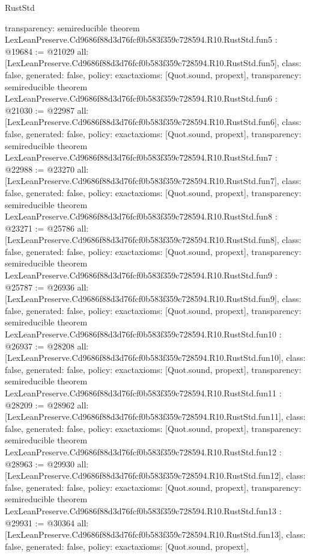 \begin{lexlean}{RustStd}
\begin{coremodule}
{  transparency: semireducible
}
theorem LexLeanPreserve.Cd9686f88d3d76fcf0b583f359c728594.R10.RustStd.fun5 : @19684 := @21029 {
  all: [LexLeanPreserve.Cd9686f88d3d76fcf0b583f359c728594.R10.RustStd.fun5],
  class: false,
  generated: false,
  policy: exact{axioms: [Quot.sound, propext]},
  transparency: semireducible
}
theorem LexLeanPreserve.Cd9686f88d3d76fcf0b583f359c728594.R10.RustStd.fun6 : @21030 := @22987 {
  all: [LexLeanPreserve.Cd9686f88d3d76fcf0b583f359c728594.R10.RustStd.fun6],
  class: false,
  generated: false,
  policy: exact{axioms: [Quot.sound, propext]},
  transparency: semireducible
}
theorem LexLeanPreserve.Cd9686f88d3d76fcf0b583f359c728594.R10.RustStd.fun7 : @22988 := @23270 {
  all: [LexLeanPreserve.Cd9686f88d3d76fcf0b583f359c728594.R10.RustStd.fun7],
  class: false,
  generated: false,
  policy: exact{axioms: [Quot.sound, propext]},
  transparency: semireducible
}
theorem LexLeanPreserve.Cd9686f88d3d76fcf0b583f359c728594.R10.RustStd.fun8 : @23271 := @25786 {
  all: [LexLeanPreserve.Cd9686f88d3d76fcf0b583f359c728594.R10.RustStd.fun8],
  class: false,
  generated: false,
  policy: exact{axioms: [Quot.sound, propext]},
  transparency: semireducible
}
theorem LexLeanPreserve.Cd9686f88d3d76fcf0b583f359c728594.R10.RustStd.fun9 : @25787 := @26936 {
  all: [LexLeanPreserve.Cd9686f88d3d76fcf0b583f359c728594.R10.RustStd.fun9],
  class: false,
  generated: false,
  policy: exact{axioms: [Quot.sound, propext]},
  transparency: semireducible
}
theorem LexLeanPreserve.Cd9686f88d3d76fcf0b583f359c728594.R10.RustStd.fun10 : @26937 := @28208 {
  all: [LexLeanPreserve.Cd9686f88d3d76fcf0b583f359c728594.R10.RustStd.fun10],
  class: false,
  generated: false,
  policy: exact{axioms: [Quot.sound, propext]},
  transparency: semireducible
}
theorem LexLeanPreserve.Cd9686f88d3d76fcf0b583f359c728594.R10.RustStd.fun11 : @28209 := @28962 {
  all: [LexLeanPreserve.Cd9686f88d3d76fcf0b583f359c728594.R10.RustStd.fun11],
  class: false,
  generated: false,
  policy: exact{axioms: [Quot.sound, propext]},
  transparency: semireducible
}
theorem LexLeanPreserve.Cd9686f88d3d76fcf0b583f359c728594.R10.RustStd.fun12 : @28963 := @29930 {
  all: [LexLeanPreserve.Cd9686f88d3d76fcf0b583f359c728594.R10.RustStd.fun12],
  class: false,
  generated: false,
  policy: exact{axioms: [Quot.sound, propext]},
  transparency: semireducible
}
theorem LexLeanPreserve.Cd9686f88d3d76fcf0b583f359c728594.R10.RustStd.fun13 : @29931 := @30364 {
  all: [LexLeanPreserve.Cd9686f88d3d76fcf0b583f359c728594.R10.RustStd.fun13],
  class: false,
  generated: false,
  policy: exact{axioms: [Quot.sound, propext]},
}
\end{coremodule}
\end{lexlean}
